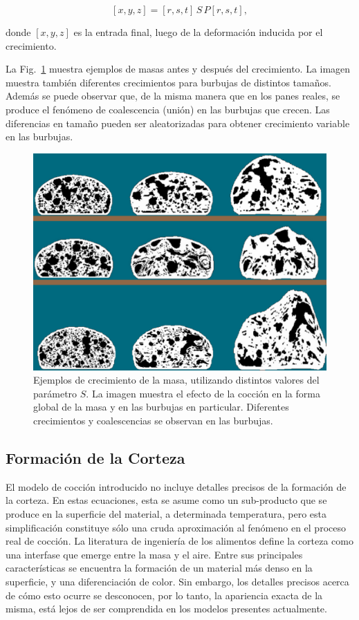 \begin{equation}
\label{Eq:rise}
[x,y,z] = [r,s,t]\, S \, P[r,s,t],
\end{equation}

\noindent donde $[x,y,z]$ es la entrada final, luego de la deformación inducida por el crecimiento.

La Fig.~\ref{fg:rising} muestra ejemplos de masas antes y después del crecimiento.
La imagen muestra también diferentes crecimientos para burbujas de distintos tamaños.
Además se puede observar que, de la misma manera que en los panes reales, se produce el fenómeno de coalescencia (unión) en las burbujas que crecen.
Las diferencias en tamaño pueden ser aleatorizadas para obtener crecimiento variable en las burbujas.

\begin{figure}
\includegraphics[width=12cm]{figures/Fig9}
\caption[Ejemplos de crecimiento de la masa, utilizando distintos valores del parámetro $S$]{Ejemplos de crecimiento de la masa, utilizando distintos valores del parámetro $S$. La imagen muestra el efecto de la cocción en la forma global de la masa y en las burbujas en particular. Diferentes crecimientos y coalescencias se observan en las burbujas. }
\label{fg:rising}
\end{figure}


\subsection{Formación de la Corteza}
El modelo de cocción introducido no incluye detalles precisos de la formación de la corteza.
En estas ecuaciones, esta se asume como un sub-producto que se produce en la superficie del material, a determinada temperatura, pero esta simplificación constituye sólo una cruda aproximación al fenómeno en el proceso real de cocción.
La literatura de ingeniería de los alimentos define la corteza como una interfase que emerge entre la masa y el aire.
Entre sus principales características se encuentra la formación de un material más denso en la superficie, y una diferenciación de color.
Sin embargo, los detalles precisos acerca de cómo esto ocurre se desconocen, por lo tanto, la apariencia exacta de la misma, está lejos de ser comprendida en los modelos presentes actualmente.

